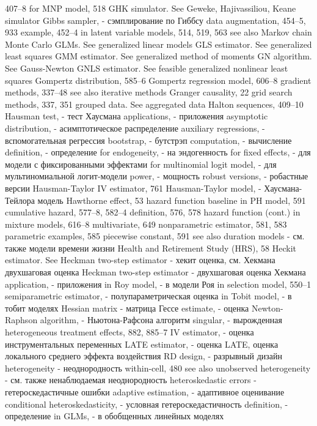 407–8
for MNP model, 518
GHK simulator. See Geweke, Hajivassiliou, Keane simulator
Gibbs sampler, - сэмплирование по Гиббсу
data augmentation, 454–5, 933 example, 452–4
in latent variable models, 514, 519, 563 see also Markov chain Monte Carlo
GLMs. See generalized linear models
GLS estimator. See generalized least squares
GMM estimator. See generalized method of moments GN algorithm. See Gauss-Newton
GNLS estimator. See feasible generalized nonlinear
least squares
Gompertz distribution, 585–6 Gompertz regression model, 606–8 gradient methods, 337–48
see also iterative methods Granger causality, 22
grid search methods, 337, 351 grouped data. See aggregated data
Halton sequences, 409–10 Hausman test, - тест Хаусмана
applications, - приложения
asymptotic distribution, - асимптотическое распределение
auxiliary regressions, - вспомогательная регрессия
bootstrap, - бутстрэп
computation, - вычисление 
definition, - определение
for endogeneity, - на эндогенность
for fixed effects, - для модели с фиксированными эффектами 
for multinomial logit model, - для мультиномиальной логит-модели 
power, - мощность
robust versions, - робастные версии 
Hausman-Taylor IV estimator, 761 
Hausman-Taylor model, - Хаусмана-Тейлора модель 
Hawthorne effect, 53
hazard function
baseline in PH model, 591 cumulative hazard, 577–8, 582–4 definition, 576, 578
hazard function (cont.)
in mixture models, 616–8 multivariate, 649
nonparametric estimator, 581, 583 parametric examples, 585 piecewise constant, 591
see also duration models - см. также модели времени жизни
Health and Retirement Study (HRS), 58
Heckit estimator. See Heckman two-step estimator - хекит оценка, см. Хекмана двухшаговая оценка 
Heckman two-step estimator - двухшаговая оценка Хекмана 
application, - приложения
in Roy model, - в модели Роя
in selection model, 550–1 
semiparametric estimator, - полупараметрическая оценка 
in Tobit model, - в тобит моделях
Hessian matrix - матрица Гессе
estimate, - оценка
Newton-Raphson algorithm, - Ньютона-Рафсона алгоритм 
singular, - вырожденная
heterogeneous treatment effects, 882, 885–7 
IV estimator, - оценка инструментальных переменных 
LATE estimator, - оценка LATE, оценка локального среднего эффекта воздействия
RD design, - разрывный дизайн
heterogeneity - неоднородность
within-cell, 480
see also unobserved heterogeneity - см. также ненаблюдаемая неоднородность
heteroskedastic errors - гетероскедастичные ошибки
adaptive estimation, - адаптивное оценивание
conditional heteroskedasticity, - условная гетероскедастичность 
definition, - определение
in GLMs, - в обобщенных линейных моделях
